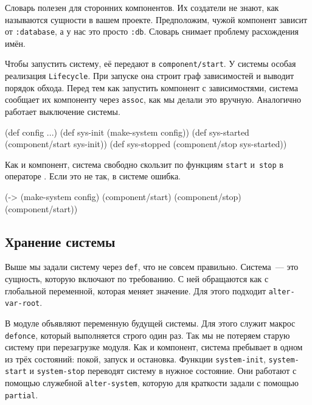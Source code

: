 Словарь полезен для сторонних компонентов. Их создатели не знают, как называются
сущности в вашем проекте. Предположим, чужой компонент зависит от
\verb|:database|, а у нас это просто \verb|:db|. Словарь снимает проблему
расхождения имён.

Чтобы запустить систему, её передают в \verb|component/start|. У системы
особая реализация \verb|Lifecycle|. При запуске она строит граф зависимостей и
выводит порядок обхода. Перед тем как запустить компонент с зависимостями,
система сообщает их компоненту через \verb|assoc|, как мы делали это
вручную. Аналогично работает выключение системы.

\begin{english}
  \begin{clojure}
(def config {...})
(def sys-init (make-system config))
(def sys-started (component/start sys-init))
(def sys-stopped (component/stop sys-started))
  \end{clojure}
\end{english}

Как и компонент, система свободно скользит по функциям \verb|start|
и~\verb|stop| в операторе \arr. Если это не так, в системе ошибка.

\begin{english}
  \begin{clojure}
(-> (make-system config)
    (component/start)
    (component/stop)
    (component/start))
  \end{clojure}
\end{english}

\subsection{Хранение системы}


Выше мы задали систему через \verb|def|, что не совсем правильно. Система~--- это
сущность, которую включают по требованию. С ней обращаются как с глобальной
переменной, которая меняет значение. Для этого подходит \verb|alter-var-root|.

В модуле объявляют переменную будущей системы. Для этого служит макрос
\verb|defonce|, который выполняется строго один раз. Так мы не потеряем старую
систему при перезагрузке модуля. Как и компонент, система пребывает в одном из
трёх состояний: покой, запуск и остановка. Функции \verb|system-init|,
\verb|system-start| и \verb|system-stop| переводят систему в нужное
состояние. Они работают с помощью служебной \verb|alter-system|, которую для
краткости задали с помощью \verb|partial|.

